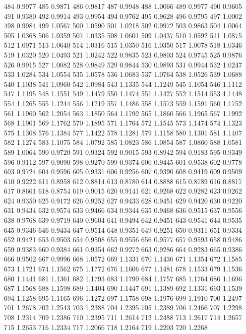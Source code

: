 484 0.9977
485 0.9871
486 0.9817
487 0.9948
488 1.0066
489 0.9977
490 0.9605
491 0.9380
492 0.9914
493 0.9954
494 0.9762
495 0.9628
496 0.9795
497 1.0002
498 0.9984
499 1.0567
500 1.0590
501 1.0218
502 0.9972
503 0.9863
504 1.0064
505 1.0368
506 1.0359
507 1.0335
508 1.0601
509 1.0437
510 1.0592
511 1.0875
512 1.0971
513 1.0640
514 1.0316
515 1.0350
516 1.0350
517 1.0078
518 1.0346
519 1.0320
520 1.0493
521 1.0242
522 0.9835
523 0.9803
524 0.9745
525 0.9876
526 0.9915
527 1.0082
528 0.9849
529 0.9844
530 0.9893
531 0.9944
532 1.0247
533 1.0284
534 1.0554
535 1.0578
536 1.0683
537 1.0764
538 1.0526
539 1.0688
540 1.1038
541 1.0960
542 1.0984
543 1.1335
544 1.1249
545 1.1054
546 1.1112
547 1.1195
548 1.1551
549 1.1479
550 1.1474
551 1.1427
552 1.1514
553 1.1448
554 1.1265
555 1.1244
556 1.1219
557 1.1486
558 1.1573
559 1.1591
560 1.1752
561 1.1960
562 1.2054
563 1.1850
564 1.1792
565 1.1860
566 1.1965
567 1.1992
568 1.1901
569 1.1762
570 1.1895
571 1.1764
572 1.1545
573 1.1474
574 1.1323
575 1.1308
576 1.1384
577 1.1422
578 1.1281
579 1.1158
580 1.1301
581 1.1407
582 1.1274
583 1.1075
584 1.0792
585 1.0823
586 1.0854
587 1.0860
588 1.0581
589 1.0064
590 0.9720
591 0.9324
592 0.9015
593 0.8942
594 0.9183
595 0.9349
596 0.9112
597 0.9090
598 0.9270
599 0.9374
600 0.9445
601 0.9538
602 0.9778
603 0.9724
604 0.9596
605 0.9331
606 0.9256
607 0.9390
608 0.9419
609 0.9509
610 0.9222
611 0.8958
612 0.8814
613 0.8780
614 0.8888
615 0.8789
616 0.8817
617 0.8661
618 0.8754
619 0.9015
620 0.9141
621 0.9268
622 0.9282
623 0.9262
624 0.9350
625 0.9172
626 0.9252
627 0.9433
628 0.9451
629 0.9420
630 0.9220
631 0.9434
632 0.9574
633 0.9466
634 0.9344
635 0.9468
636 0.9515
637 0.9556
638 0.9768
639 0.9719
640 0.9604
641 0.9494
642 0.9451
643 0.9541
644 0.9535
645 0.9346
646 0.9434
647 0.9514
648 0.9351
649 0.9251
650 0.9311
651 0.9334
652 0.9421
653 0.9503
654 0.9508
655 0.9556
656 0.9577
657 0.9593
658 0.9486
659 0.9383
660 0.9384
661 0.9354
662 0.9272
663 0.9286
664 0.9283
665 0.9386
666 0.9502
667 0.9996
668 1.0572
669 1.1331
670 1.1430
671 1.1354
672 1.1585
673 1.1721
674 1.1562
675 1.1772
676 1.1606
677 1.1481
678 1.1533
679 1.1536
680 1.1441
681 1.1361
682 1.1793
683 1.1799
684 1.1757
685 1.1764
686 1.1696
687 1.1568
688 1.1598
689 1.1404
690 1.1447
691 1.1389
692 1.1331
693 1.1539
694 1.1258
695 1.1165
696 1.1272
697 1.1758
698 1.1976
699 1.1910
700 1.2497
701 1.2678
702 1.2543
703 1.2388
704 1.2395
705 1.2389
706 1.2466
707 1.2298
708 1.2314
709 1.2386
710 1.2395
711 1.2614
712 1.2488
713 1.2617
714 1.2657
715 1.2653
716 1.2334
717 1.2066
718 1.2164
719 1.2203
720 1.2268
